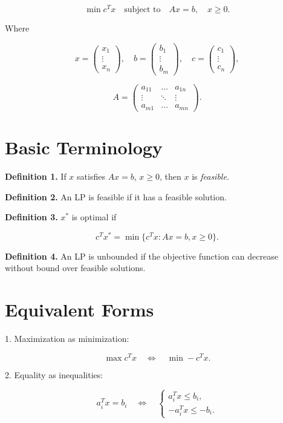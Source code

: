 \documentclass[12pt]{article}
\begin{document}
\[
\min c^T x
\quad \text{subject to}
\quad
Ax = b,
\quad
x \ge 0.
\tag{LP-1}
\]

Where

\[
x =
\begin{pmatrix}
x_1 \\ \vdots \\ x_n
\end{pmatrix},
\quad
b =
\begin{pmatrix}
b_1 \\ \vdots \\ b_m
\end{pmatrix},
\quad
c =
\begin{pmatrix}
c_1 \\ \vdots \\ c_n
\end{pmatrix},
\]

\[
A =
\begin{pmatrix}
a_{11} & \dots & a_{1n} \\
\vdots & \ddots & \vdots \\
a_{m1} & \dots & a_{mn}
\end{pmatrix}.
\]

\section{Basic Terminology}

\textbf{Definition 1.}  
If $x$ satisfies $Ax=b$, $x\ge 0$, then $x$ is \emph{feasible}.

\textbf{Definition 2.}  
An LP is feasible if it has a feasible solution.

\textbf{Definition 3.}  
$x^*$ is optimal if

\[
c^T x^* = \min \{c^T x : Ax=b, x\ge 0\}.
\]

\textbf{Definition 4.}  
An LP is unbounded if the objective function can decrease without bound over feasible solutions.

\section{Equivalent Forms}

1. Maximization as minimization:

\[
\max c^T x \quad \Longleftrightarrow \quad \min -c^T x.
\]

2. Equality as inequalities:

\[
a_i^T x = b_i
\quad \Longleftrightarrow \quad
\begin{cases}
a_i^T x \le b_i, \\
-a_i^T x \le -b_i.
\end{cases}
\tag{LP-2}
\]
\end{document}
